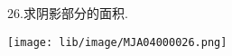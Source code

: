 26.求阴影部分的面积.

\begin{flushright}

    \texttt{[image: lib/image/MJA04000026.png]}

\end{flushright}



